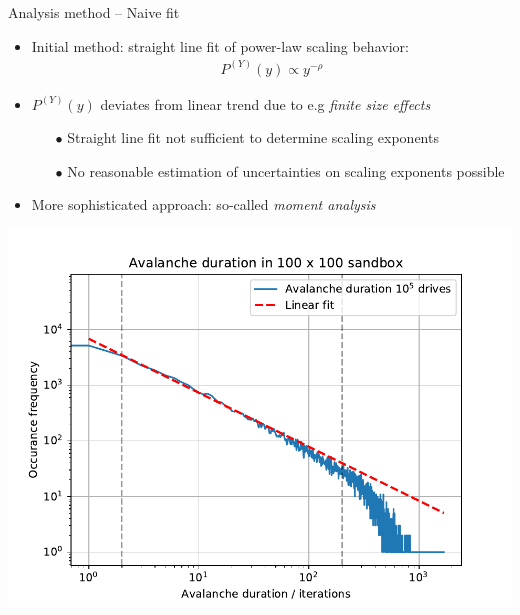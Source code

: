 \documentclass[xcolor=dvipsnames]{beamer}
\begin{document}
    \begin{frame}[t]{Analysis method -- Naive fit}
    	\begin{itemize}
    		\item {Initial method: straight line fit of power-law scaling behavior:
    			\begin{align*}
    			P^{(Y)}(y) \propto y^{-\rho}
    			\end{align*}}
    	\end{itemize}
    	\begin{minipage}[l]{0.5\textwidth}
    		\begin{itemize}
    			\item<2-> {$P^{(Y)}(y)$ deviates from linear trend due to e.g \textit{finite size effects}
    				\begin{itemize}
    					\item[$\bullet$] Straight line fit not sufficient to determine scaling exponents
    					\item[$\bullet$] No reasonable estimation of uncertainties on scaling exponents possible 
    				\end{itemize}}
    			\item<2->[$\Rightarrow$] More sophisticated approach: so-called \textit{moment analysis}
    		\end{itemize}
    	\end{minipage}
    	\begin{minipage}[r]{0.475\textwidth}
    			\centering
    			\includegraphics[width=\textwidth]{naive_fit.pdf}
    	\end{minipage}
    \end{frame}
    
\end{document}
